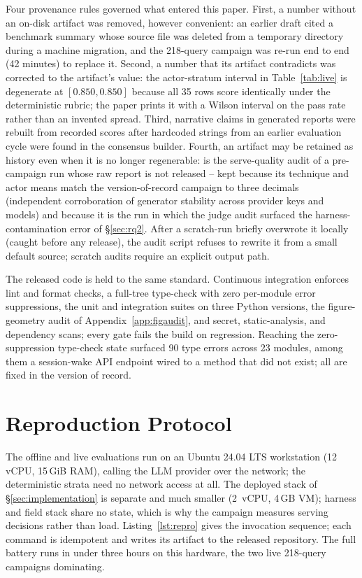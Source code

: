 Four provenance rules governed what entered this paper. First, a number
without an on-disk artifact was removed, however convenient: an earlier
draft cited a benchmark summary whose source file was deleted from a
temporary directory during a machine migration, and the 218-query campaign
was re-run end to end (42 minutes) to replace it. Second, a number that
its artifact contradicts was corrected to the artifact's value: the
actor-stratum interval in Table~\ref{tab:live} is degenerate at
$[0.850, 0.850]$ because all 35 rows score identically under the
deterministic rubric; the paper prints it with a Wilson interval on the
pass rate rather than an invented spread. Third, narrative claims in
generated reports were rebuilt from recorded scores after hardcoded
strings from an earlier evaluation cycle were found in the consensus
builder. Fourth, an artifact may be retained as history even when it is
no longer regenerable:  is the
serve-quality audit of a pre-campaign run whose raw report is not
released -- kept because its technique and actor means match the
version-of-record campaign to three decimals (independent corroboration
of generator stability across provider keys and models) and because it
is the run in which the judge audit surfaced the harness-contamination
error of \S\ref{sec:rq2}. After a scratch-run briefly overwrote it
locally (caught before any release), the audit script refuses to
rewrite it from a small default source; scratch audits require an
explicit output path.

The released code is held to the same standard. Continuous integration
enforces lint and format checks, a full-tree type-check with zero
per-module error suppressions, the unit and integration suites on three
Python versions, the figure-geometry audit of
Appendix~\ref{app:figaudit}, and secret, static-analysis, and dependency
scans; every gate fails the build on regression. Reaching the
zero-suppression type-check state surfaced 90 type errors across 23
modules, among them a session-wake API endpoint wired to a method that
did not exist; all are fixed in the version of record.

\section{Reproduction Protocol}
\label{app:repro}
The offline and live evaluations run on an Ubuntu 24.04 LTS workstation
(12 vCPU, 15\,GiB RAM), calling the LLM provider over the network; the
deterministic strata need no network access at all. The deployed stack of
\S\ref{sec:implementation} is separate and much smaller (2~vCPU, 4\,GB
VM); harness and field stack share no state, which is why the campaign
measures serving decisions rather than load. Listing~\ref{lst:repro}
gives the invocation sequence; each command is idempotent and writes its
artifact to the released repository. The full battery runs in under
three hours on this hardware, the two live 218-query campaigns
dominating.

